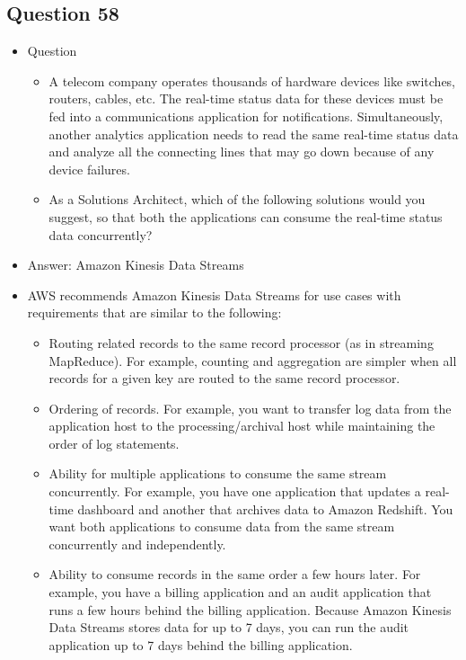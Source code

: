 \documentclass[]{scrartcl}
\begin{document}
\subsection{Question 58}
\begin{itemize}
	\item Question
	\begin{itemize}
		\item A telecom company operates thousands of hardware devices like switches, routers, cables, etc. The real-time status data for these devices must be fed into a communications application for notifications. Simultaneously, another analytics application needs to read the same real-time status data and analyze all the connecting lines that may go down because of any device failures.
		\item As a Solutions Architect, which of the following solutions would you suggest, so that both the applications can consume the real-time status data concurrently?
	\end{itemize}
	\item Answer: Amazon Kinesis Data Streams
	\item AWS recommends Amazon Kinesis Data Streams for use cases with requirements that are similar to the following:
	\begin{itemize}
		\item Routing related records to the same record processor (as in streaming MapReduce). For example, counting and aggregation are simpler when all records for a given key are routed to the same record processor.
		\item Ordering of records. For example, you want to transfer log data from the application host to the processing/archival host while maintaining the order of log statements.
		\item Ability for multiple applications to consume the same stream concurrently. For example, you have one application that updates a real-time dashboard and another that archives data to Amazon Redshift. You want both applications to consume data from the same stream concurrently and independently.
		\item Ability to consume records in the same order a few hours later. For example, you have a billing application and an audit application that runs a few hours behind the billing application. Because Amazon Kinesis Data Streams stores data for up to 7 days, you can run the audit application up to 7 days behind the billing application.
	\end{itemize}
\end{itemize}
\end{document}
